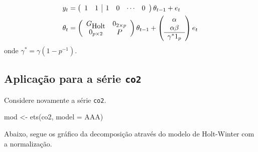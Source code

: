 \documentclass[
  letterpaper,
  DIV=11,
  numbers=noendperiod]{scrartcl}
\newenvironment{Shaded}{\begin{snugshade}}{\end{snugshade}}
\newcommand{\AttributeTok}[1]{\textcolor[rgb]{0.40,0.45,0.13}{#1}}
\newcommand{\DecValTok}[1]{\textcolor[rgb]{0.68,0.00,0.00}{#1}}
\newcommand{\FunctionTok}[1]{\textcolor[rgb]{0.28,0.35,0.67}{#1}}
\newcommand{\NormalTok}[1]{\textcolor[rgb]{0.00,0.23,0.31}{#1}}
\newcommand{\OtherTok}[1]{\textcolor[rgb]{0.00,0.23,0.31}{#1}}
\newcommand{\SpecialCharTok}[1]{\textcolor[rgb]{0.37,0.37,0.37}{#1}}
\newcommand{\StringTok}[1]{\textcolor[rgb]{0.13,0.47,0.30}{#1}}
\theoremstyle{plain}
\theoremstyle{plain}
\theoremstyle{definition}
\theoremstyle{definition}
\theoremstyle{remark}
\begin{document}
\[\begin{align}
y_t&=\left(\begin{array}{cc|cccc}1&1&1&0&\cdots&0\end{array}\right)\theta_{t-1}+e_t\\
\theta_t&=\left(\begin{array}{cc}G_{\hbox{Holt}} & 0_{2\times p}\\
0_{p\times 2} & P\end{array}\right)\theta_{t-1}+\left(\begin{array}{c}\alpha \\ \alpha\beta \\ \hline \gamma^*1_p \end{array}\right)e_t\end{align}\]
onde \(\gamma^*=\gamma(1-p^{-1})\).

\hypertarget{aplicauxe7uxe3o-para-a-suxe9rie-co2}{%
\subsection{\texorpdfstring{Aplicação para a série
\texttt{co2}}{Aplicação para a série co2}}\label{aplicauxe7uxe3o-para-a-suxe9rie-co2}}

Considere novamente a série \texttt{co2}.

\begin{Shaded}
\begin{Highlighting}[]
\NormalTok{mod }\OtherTok{\textless{}{-}} \FunctionTok{ets}\NormalTok{(co2, }\AttributeTok{model =} \StringTok{\textquotesingle{}AAA\textquotesingle{}}\NormalTok{)}
\end{Highlighting}
\end{Shaded}

Abaixo, segue os gráfico da decomposição através do modelo de
Holt-Winter com a normalização.

\begin{Shaded}
\end{Shaded}
\end{document}
